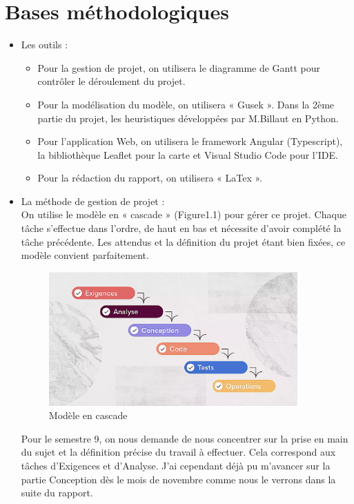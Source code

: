 \documentclass{polytech/polytech}
\numberwithin{figure}{chapter}
\begin{document}
\section{Bases méthodologiques}
\begin{itemize}
\item Les outils : 
\begin{itemize}
    \item Pour la gestion de projet, on utilisera le diagramme de Gantt pour contrôler le déroulement du projet.
    \item Pour la modélisation du modèle, on utilisera « Gusek ». Dans la 2ème partie du projet, les \glspl{heuristique} développées par M.Billaut en Python. 
    \item Pour l'application Web, on utilisera le framework Angular (Typescript), la bibliothèque Leaflet pour la carte et Visual Studio Code pour l'IDE.
    \item Pour la rédaction du rapport, on utilisera « LaTex ».\\
\end{itemize}

\item La méthode de gestion de projet :\\
On utilise le modèle en « cascade » (Figure1.1) pour gérer ce projet. Chaque tâche s'effectue dans l'ordre, de haut en bas et nécessite d'avoir complété la tâche précédente.
Les attendus et la définition du projet étant bien fixées, ce modèle convient parfaitement.\\
\begin{figure}[h!]
    \centering 
    \includegraphics[width=0.9\textwidth]{pic/cascade.png} 
    \caption{Modèle en cascade}
    \label{Modèle en cascade}
\end{figure}

Pour le semestre 9, on nous demande de nous concentrer sur la prise en main du sujet et la définition précise du travail à effectuer. Cela correspond aux tâches d'Exigences et d’Analyse.
J'ai cependant déjà pu m'avancer sur la partie Conception dès le mois de novembre comme nous le verrons dans la suite du rapport.
\end{itemize}
\end{document}
